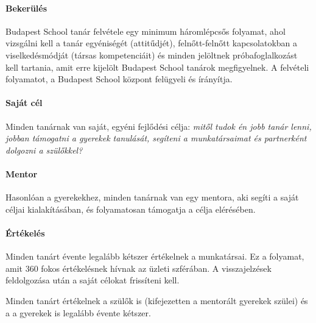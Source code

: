 \paragraph{Bekerülés}
Budapest School tanár felvétele egy minimum háromlépcsős folyamat, ahol vizsgálni kell a tanár egyéniségét (attitűdjét), felnőtt-felnőtt kapcsolatokban a viselkedésmódját (társas kompetenciáit) és minden jelöltnek próbafoglalkozást kell tartania, amit erre kijelölt Budapest School tanárok megfigyelnek. A felvételi folyamatot, a Budapest School központ felügyeli és írányítja.

\paragraph{Saját cél}

Minden tanárnak van saját, egyéni fejlődési célja: \emph{mitől tudok én jobb tanár lenni, jobban támogatni a gyerekek tanulását, segíteni a munkatársaimat és partnerként dolgozni a szülőkkel?}

\paragraph{Mentor}

Hasonlóan a gyerekekhez, minden tanárnak van egy mentora, aki segíti a saját céljai kialakításában, és folyamatosan támogatja a célja elérésében.

\paragraph{Értékelés}

Minden tanárt évente legalább kétszer értékelnek a munkatársai. Ez a folyamat, amit 360 fokos értékelésnek hívnak az üzleti szférában. A visszajelzések feldolgozása után a saját célokat frissíteni kell.

Minden tanárt értékelnek a szülők is (kifejezetten a mentorált gyerekek szülei) és a a gyerekek is legalább évente kétszer.
